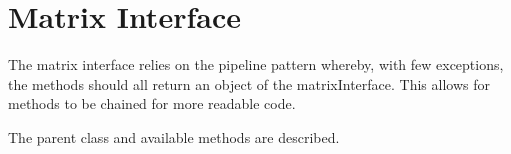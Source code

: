 \documentclass[letterpaper,10pt,english]{sphinxmanual}
\begin{document}

\chapter{Matrix Interface}
\label{\detokenize{index:matrix-interface}}\label{\detokenize{index:module-utils.matrixInterface}}
\sphinxAtStartPar
The matrix interface relies on the pipeline pattern whereby, with few exceptions, the methods
should all return an object of the matrixInterface. This allows for methods to be chained 
for more readable code.

\sphinxAtStartPar
The parent class and available methods are described.
\end{document}
